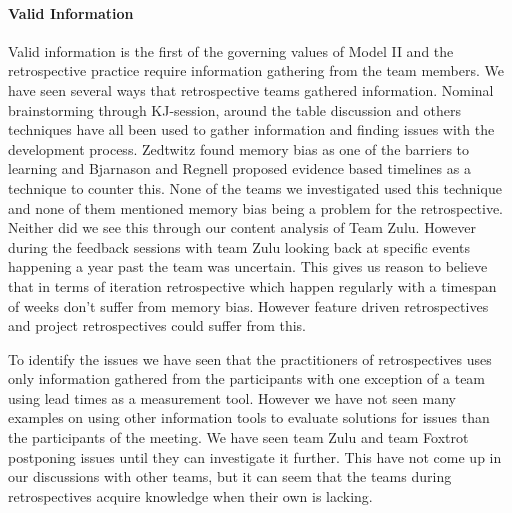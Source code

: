 \paragraph{Valid Information}
Valid information is the first of the governing values of Model II and the retrospective practice require information gathering from the team members. We have seen several ways that retrospective teams gathered information. Nominal brainstorming through KJ-session, around the table discussion and others techniques have all been used to gather information and finding issues with the development process. Zedtwitz\cite{Zedtwitz2002} found memory bias as one of the barriers to learning and Bjarnason and Regnell\cite{Bjarnason2012} proposed evidence based timelines as a technique to counter this. None of the teams we investigated used this technique and none of them mentioned memory bias being a problem for the retrospective. Neither did we see this through our content analysis of Team Zulu. However during the feedback sessions with team Zulu looking back at specific events happening a year past the team was uncertain. This gives us reason to believe that in terms of iteration retrospective which happen regularly with a timespan of weeks don't suffer from memory bias. However feature driven retrospectives and project retrospectives could suffer from this. 

To identify the issues we have seen that the practitioners of retrospectives uses only information gathered from the participants with one exception of a team using lead times as a measurement tool. However we have not seen many examples on using other information tools to evaluate solutions for issues than the participants of the meeting. We have seen team Zulu and team Foxtrot postponing issues until they can investigate it further. This have not come up in our discussions with other teams, but it can seem that the teams during retrospectives acquire knowledge when their own is lacking.


